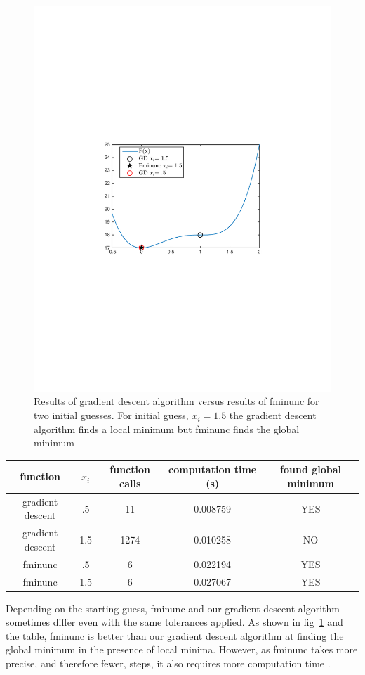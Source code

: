 \documentclass{article}
\begin{document}
\begin{figure}[H]
\label{fig: fminunc}
\center
\includegraphics[scale =.6]{comparetofminunc.pdf}
\caption{Results of gradient descent algorithm versus results of fminunc for two initial guesses. For initial guess, $x_i= 1.5$ the gradient descent algorithm finds a local minimum but fminunc finds the global minimum}
\end{figure}
 

\begin{center}
  \begin{tabular}{ | c | c | c | c | c | }
    \hline
     function & $x_i$ & function calls & computation time (s) & found global minimum \\ \hline
     gradient descent & .5 &  11 &  0.008759 & YES \\ \hline
     gradient descent & 1.5 & 1274  & 0.010258 & NO \\ \hline
    fminunc & .5  & 6 & 0.022194 & YES  \\ \hline
      fminunc &1.5 & 6 & 0.027067 & YES \\ 
    \hline
  \end{tabular}
\end{center}
Depending on the starting guess, fminunc and our gradient descent algorithm sometimes differ even with the same tolerances applied. As shown in fig~\ref{fig: fminunc} and the table, fminunc is better than our gradient descent algorithm at finding the global minimum in the presence of local minima.  However, as fminunc takes more precise, and therefore fewer, steps,  it also requires more computation time .
\end{document}
